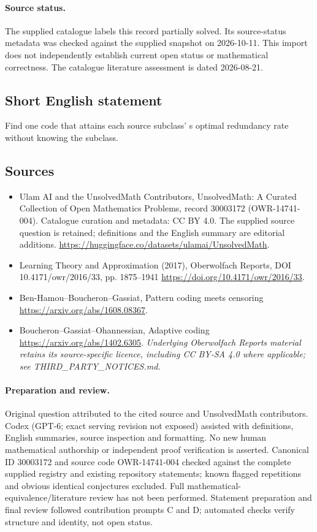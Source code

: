 \documentclass[11pt]{article}
\begin{document}
\paragraph{Source status.}
The supplied catalogue labels this record partially solved. Its source-status metadata was checked against the supplied snapshot on 2026-10-11. This import does not independently establish current open status or mathematical correctness. The catalogue literature assessment is dated 2026-08-21.
\subsection{Short English statement}
Find one code that attains each source subclass' s optimal redundancy rate without knowing the subclass.
\subsection{Sources}
\begin{itemize}
\item[\hypertarget{source:30003172:1}{S1}] Ulam AI and the UnsolvedMath Contributors, UnsolvedMath: A Curated Collection of Open Mathematics Problems, record 30003172 (OWR-14741-004). Catalogue curation and metadata: CC BY 4.0. The supplied source question is retained; definitions and the English summary are editorial additions.
\url{https://huggingface.co/datasets/ulamai/UnsolvedMath}.
\item[\hypertarget{source:30003172:2}{S2}] Learning Theory and Approximation (2017), Oberwolfach Reports, DOI 10.4171/owr/2016/33, pp. 1875--1941
\url{https://doi.org/10.4171/owr/2016/33}.
\item[\hypertarget{source:30003172:3}{S3}] Ben-Hamou--Boucheron--Gassiat, Pattern coding meets censoring
\url{https://arxiv.org/abs/1608.08367}.
\item[\hypertarget{source:30003172:4}{S4}] Boucheron--Gassiat--Ohannessian, Adaptive coding
\url{https://arxiv.org/abs/1402.6305}.
\textit{Underlying Oberwolfach Reports material retains its source-specific licence, including CC BY-SA 4.0 where applicable; see THIRD\_PARTY\_NOTICES.md.}
\end{itemize}
\paragraph{Preparation and review.}
Original question attributed to the cited source and UnsolvedMath contributors. Codex (GPT-6; exact serving revision not exposed) assisted with definitions, English summaries, source inspection and formatting. No new human mathematical authorship or independent proof verification is asserted. Canonical ID 30003172 and source code OWR-14741-004 checked against the complete supplied registry and existing repository statements; known flagged repetitions and obvious identical conjectures excluded. Full mathematical-equivalence/literature review has not been performed. Statement preparation and final review followed contribution prompts C and D; automated checks verify structure and identity, not open status.
\label{end:30003172}
\end{document}
